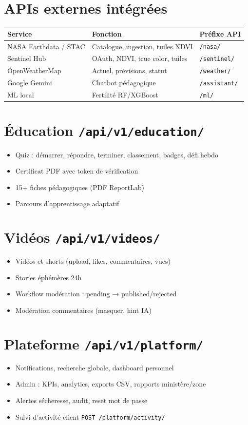 \documentclass[11pt,a4paper]{report}
\begin{document}
\section{APIs externes intégrées}
\begin{tabularx}{\textwidth}{@{}lXl@{}}
\toprule
\textbf{Service} & \textbf{Fonction} & \textbf{Préfixe API} \\
\midrule
NASA Earthdata / STAC & Catalogue, ingestion, tuiles NDVI & \texttt{/nasa/} \\
Sentinel Hub & OAuth, NDVI, true color, tuiles & \texttt{/sentinel/} \\
OpenWeatherMap & Actuel, prévisions, statut & \texttt{/weather/} \\
Google Gemini & Chatbot pédagogique & \texttt{/assistant/} \\
ML local & Fertilité RF/XGBoost & \texttt{/ml/} \\
\bottomrule
\end{tabularx}

\section{Éducation \texttt{/api/v1/education/}}
\begin{itemize}[leftmargin=*]
  \item Quiz : démarrer, répondre, terminer, classement, badges, défi hebdo
  \item Certificat PDF avec token de vérification
  \item 15+ fiches pédagogiques (PDF ReportLab)
  \item Parcours d'apprentissage adaptatif
\end{itemize}

\section{Vidéos \texttt{/api/v1/videos/}}
\begin{itemize}[leftmargin=*]
  \item Vidéos et shorts (upload, likes, commentaires, vues)
  \item Stories éphémères 24h
  \item Workflow modération : pending → published/rejected
  \item Modération commentaires (masquer, hint IA)
\end{itemize}

\section{Plateforme \texttt{/api/v1/platform/}}
\begin{itemize}[leftmargin=*]
  \item Notifications, recherche globale, dashboard personnel
  \item Admin : KPIs, analytics, exports CSV, rapports ministère/zone
  \item Alertes sécheresse, audit, reset mot de passe
  \item Suivi d'activité client \texttt{POST /platform/activity/}
\end{itemize}
\end{document}
